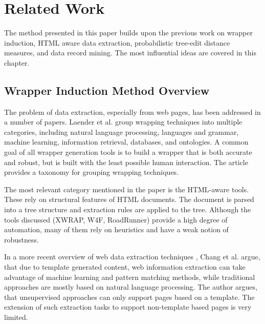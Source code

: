 \chapter{Related Work}
\label{ch:related-work}




The method presented in this paper builds upon the previous work on wrapper induction, HTML aware data extraction, probabilistic tree-edit distance measures, and data record mining. The most influential ideas are covered in this chapter.


\section{Wrapper Induction Method Overview}

The problem of data extraction, especially from web pages, has been addressed in a number of papers. Laender et al. \cite{Laender:2002:BSW:565117.565137} group wrapping techniques into multiple categories, including natural language processing, languages and grammar, machine learning, information retrieval, databases, and ontologies. A common goal of all wrapper generation tools is to build a wrapper that is both accurate and robust, but is built with the least possible human interaction. The article provides a taxonomy for grouping wrapping techniques.

The most relevant category mentioned in the paper is the HTML-aware tools. These rely on structural features of HTML documents. The document is parsed into a tree structure and extraction rules are applied to the tree. Although the tools discussed (XWRAP, W4F, RoadRunner) provide a high degree of automation, many of them rely on heuristics and have a weak notion of robustness.

In a more recent overview of web data extraction techniques \cite{Chang:2006:SWI:1159162.1159300}, Chang et al. argue, that due to template generated content, web information extraction can take advantage of machine learning and pattern matching methods, while traditional approaches are mostly based on natural language processing. The author argues, that unsupervised approaches can only support pages based on a template. The extension of such extraction tasks to support non-template based pages is very limited.

